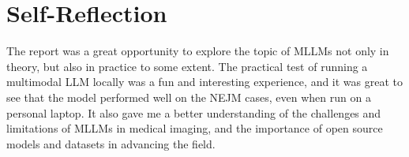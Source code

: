 \documentclass{imc-inf}
\begin{document}
\chapter{Self-Reflection}

The report was a great opportunity to explore the topic of MLLMs not only in theory, but also in practice to some extent.
The practical test of running a multimodal LLM locally was a fun and interesting experience, and it was great to see that the model performed well on the NEJM cases, even when run on a personal laptop.
It also gave me a better understanding of the challenges and limitations of MLLMs in medical imaging, and the importance of open source models and datasets in advancing the field.

\backmatter%
	
 \typeout{}
	
	
\end{document}
